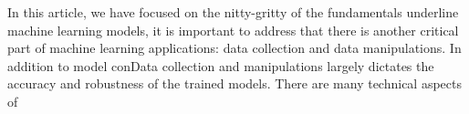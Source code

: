 In this article, we have focused on the nitty-gritty of the fundamentals underline machine learning models, it is important to address that there is another critical part of machine learning applications: data collection and data manipulations. In addition to model conData collection and manipulations largely dictates the accuracy and robustness of the trained models. There are many technical aspects of 